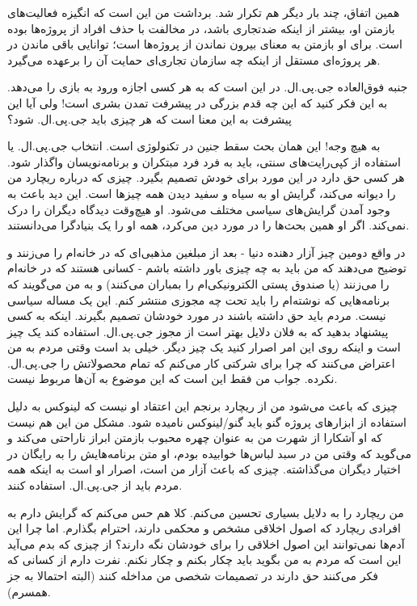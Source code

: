 همین اتفاق،‌ چند بار دیگر هم تکرار شد. برداشت من این است که انگیزه
فعالیت‌های بازمتن او، بیشتر از اینکه ضدتجاری باشد، در مخالفت با حذف
افراد از پروژه‌ها بوده است. برای او بازمتن به معنای بیرون نماندن از
پروژه‌ها است؛ توانایی باقی ماندن در هر پروژه‌ای مستقل از اینکه چه سازمان
تجاری‌ای حمایت آن را برعهده می‌گیرد.

جنبه فوق‌العاده جی.پی.ال. در این است که به هر کسی اجازه ورود به بازی را
می‌دهد. به این فکر کنید که این چه قدم بزرگی در پیشرفت تمدن بشری است!
ولی آیا این پیشرفت به این معنا است که هر چیزی باید جی.پی.ال. شود؟

به هیچ وجه! این همان بحث سقط جنین در تکنولوژی است. انتخاب جی.پی.ال. یا
استفاده از کپی‌رایت‌های سنتی، باید به فرد فرد مبتکران و برنامه‌نویسان
واگذار شود. هر کسی حق دارد در این مورد برای خودش تصمیم بگیرد. چیزی که
درباره ریچارد من را دیوانه می‌کند، گرایش او به سیاه و سفید دیدن همه
چیزها است. این دید باعث به وجود آمدن گرایش‌های سیاسی مختلف می‌شود. او
هیچ‌وقت دیدگاه دیگران را درک نمی‌کند. اگر او همین بحث‌ها را در مورد دین
می‌کرد، همه او را یک بنیادگرا می‌دانستند.

در واقع دومین چیز آزار دهنده دنیا - بعد از مبلغین مذهبی‌ای که در خانه‌ام
را می‌زنند و توضیح می‌دهند که من باید به چه چیزی باور داشته باشم - کسانی
هستند که در خانه‌ام را می‌زنند (یا صندوق پستی الکترونیکی‌ام را بمباران
می‌کنند) و به من می‌گویند که برنامه‌هایی که نوشته‌ام را باید تحت چه مجوزی
منتشر کنم. این یک مساله سیاسی نیست. مردم باید حق داشته باشند در مورد
خودشان تصمیم بگیرند. اینکه به کسی پیشنهاد بدهید که به فلان دلایل بهتر
است از مجوز جی.پی.ال. استفاده کند یک چیز است و اینکه روی این امر اصرار
کنید یک چیز دیگر. خیلی بد است وقتی مردم به من اعتراض می‌کنند که چرا
برای شرکتی کار می‌کنم که تمام محصولاتش را جی.پی.ال. نکرده. جواب من فقط
این است که این موضوع به آن‌ها مربوط نیست.

چیزی که باعث می‌شود من از ریچارد برنجم این اعتقاد او نیست که لینوکس به
دلیل استفاده از ابزارهای پروژه گنو باید
گنو/لینوکس نامیده شود. مشکل من این هم نیست که او آشکارا از شهرت من به
عنوان چهره محبوب بازمتن ابراز ناراحتی می‌کند و می‌گوید که وقتی من در سبد
لباس‌ها خوابیده بودم، او متن برنامه‌هایش را به رایگان در اختیار دیگران
می‌گذاشته. چیزی که باعث آزار من است، اصرار او است به اینکه همه مردم
باید از جی.پی.ال. استفاده کنند.

من ریچارد را به دلایل بسیاری تحسین می‌کنم. کلا هم حس می‌کنم که گرایش
دارم به افرادی ریچارد که اصول اخلاقی مشخص و محکمی دارند، احترام
بگذارم. اما چرا این آدم‌ها نمی‌توانند این اصول اخلاقی را برای خودشان نگه
دارند؟ از چیزی که بدم می‌آید این است که مردم به من بگوید باید چکار بکنم
و چکار نکنم. نفرت دارم از کسانی که فکر می‌کنند حق دارند در تصمیمات شخصی
من مداخله کنند (البته احتمالا به جز همسرم).

